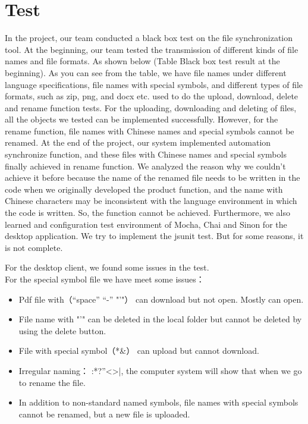 
\section{Test}

In the project, our team conducted a black box test on the file synchronization tool. At the beginning, our team tested the transmission of different kinds of file names and file formats. As shown below (Table Black box test result at the beginning). As you can see from the table, we have file names under different language specifications, file names with special symbols, and different types of file formats, such as zip, png, and docx etc. used to do the upload, download, delete and rename function tests. For the uploading, downloading and deleting of files, all the objects we tested can be implemented successfully. However, for the rename function, file names with Chinese names and special symbols cannot be renamed. \newline
At the end of the project, our system implemented automation synchronize function, and these files with Chinese names and special symbols finally achieved in rename function. We analyzed the reason why we couldn't achieve it before because the name of the renamed file needs to be written in the code when we originally developed the product function, and the name with Chinese characters may be inconsistent with the language environment in which the code is written. So, the function cannot be achieved.\newline
Furthermore, we also learned and configuration test environment of Mocha, Chai and Sinon for the desktop application. We try to implement the jsunit test. But for some reasons, it is not complete.\newline

For the desktop client, we found some issues in the test.\\
For the special symbol file we have meet some issues：\\
\begin{itemize}
\item{Pdf file with（“space” “-” "'"） can download but not open. Mostly can open.}
\item{ File name with "'" can be deleted in the local folder but cannot be deleted by using the delete button.}
\item{File with special symbol（*&） can upload but cannot download.}
\item{Irregular naming： \/:*?”<>|, the computer system will show that when we go to rename the file.}
\item{In addition to non-standard named symbols, file names with special symbols cannot be renamed, but a new file is uploaded.}
\end{itemize}

